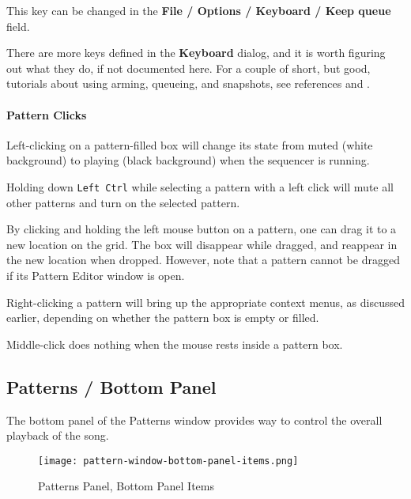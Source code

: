    This key can be changed in the
   \textbf{File / Options / Keyboard / Keep queue} field.

   There are more keys defined in the \textbf{Keyboard} dialog, and it is
   worth figuring out what they do, if not documented here.
   For a couple of short, but good, tutorials about using arming, queueing,
   and snapshots, see references \cite{wootangent1}
   and \cite{wootangent2}.

\paragraph{Pattern Clicks}
\label{paragraph:seq64_patterns_pattern_Clicks}

   Left-clicking on a pattern-filled box will change its state
   from muted (white background) to playing (black background) when
   the sequencer is running.

   Holding down \texttt{Left Ctrl} while selecting a pattern
   with a left click will mute all other patterns and turn on the selected
   pattern.

   By clicking and holding the left mouse button on a pattern,
   one can drag it to a new location on the grid.  The box
   will disappear while dragged, and reappear in the new location when
   dropped.  However, note that a pattern cannot be dragged if its
   Pattern Editor window is open.

   Right-clicking a pattern will bring up the appropriate context menus, as
   discussed earlier, depending on whether the pattern box is empty or
   filled.

   Middle-click does nothing when the mouse rests inside a pattern box.

\subsection{Patterns / Bottom Panel}
\label{subsec:seq64_patterns_panel_bottom}

   The bottom panel of the Patterns window provides way to control the
   overall playback of the song.

\begin{figure}[H]
   \centering 
   \texttt{[image: pattern-window-bottom-panel-items.png]}
   \caption{Patterns Panel, Bottom Panel Items}
   \label{fig:pattern_window_bottom_panel_items}
\end{figure}

